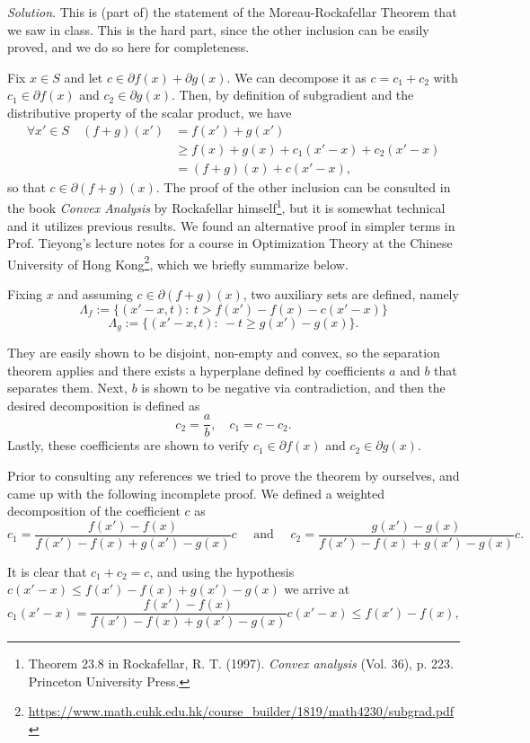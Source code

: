 \documentclass[12pt]{article}
\begin{document}
\emph{Solution}. This is (part of) the statement of the Moreau-Rockafellar Theorem that we saw in class. This is the hard part, since the other inclusion can be easily proved, and we do so here for completeness.\newpage

Fix $x\in S$ and let $c\in \partial f(x) + \partial g(x)$. We can decompose it as $c=c_1+c_2$ with $c_1\in\partial f(x)$ and $c_2\in \partial g(x)$. Then, by definition of subgradient and the distributive property of the scalar product, we have
\begin{align*}
\forall x' \in S \quad (f+g)(x') &= f(x') + g(x')\\
&\geq f(x) + g(x) + c_1(x'-x) + c_2(x'-x)\\
&= (f+g)(x) + c(x'-x),
\end{align*}
so that $c\in \partial(f+g)(x)$. The proof of the other inclusion can be consulted in the book \textit{Convex Analysis} by Rockafellar himself\footnote{Theorem 23.8 in Rockafellar, R. T. (1997). \textit{Convex analysis} (Vol. 36), p. 223. Princeton University Press.}, but it is somewhat technical and it utilizes previous results. We found an alternative proof in simpler terms in Prof. Tieyong's lecture notes for a course in Optimization Theory at the Chinese University of Hong Kong\footnote{\url{https://www.math.cuhk.edu.hk/course_builder/1819/math4230/subgrad.pdf}}, which we briefly summarize below.

Fixing $x$ and assuming $c\in \partial(f+g)(x)$, two auxiliary sets are defined, namely
\[
\Lambda_f := \{(x'-x, t): \ t > f(x')-f(x) - c(x'-x)\}
\]
\[
\Lambda_g := \{(x'-x, t): \ -t \geq g(x')-g(x)\}.
\]

They are easily shown to be disjoint, non-empty and convex, so the separation theorem applies and there exists a hyperplane defined by coefficients $a$ and $b$ that separates them. Next, $b$ is shown to be negative via contradiction, and then the desired decomposition is defined as
\[
c_2=\frac{a}{b},\quad c_1=c-c_2.
\]
Lastly, these coefficients are shown to verify $c_1\in\partial f(x)$ and $c_2\in\partial g(x)$.

Prior to consulting any references we tried to prove the theorem by ourselves, and came up with the following incomplete proof. We defined a weighted decomposition of the coefficient $c$ as
$$
c_1 = \frac{f(x') - f(x)}{f(x') - f(x) + g(x') - g(x)} c \quad \text{ and } \quad c_2 = \frac{g(x') - g(x)}{f(x') - f(x) + g(x') - g(x)} c.
$$

It is clear that $c_1 + c_2 = c$, and using the hypothesis $ c(x' - x) \leq f(x') - f(x) + g(x') - g(x)$ we arrive at
$$
    c_1(x'-x) = \frac{f(x') - f(x)}{f(x') - f(x) + g(x') - g(x)} c(x'-x) \leq f(x') - f(x),
$$
\end{document}
